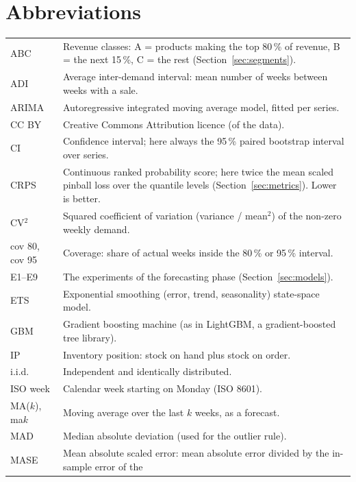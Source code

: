 \documentclass[11pt,a4paper]{article}
\begin{document}
\clearpage
\appendix

\section{Abbreviations}
\label{app:glossary}

\begin{center}
\footnotesize
\begin{tabular}{@{}>{\raggedright\arraybackslash}p{} p{}@{}}
  \toprule
  ABC & Revenue classes: A = products making the top 80\,\% of revenue, B = the next 15\,\%,
        C = the rest (Section~\ref{sec:segments}). \\
  ADI & Average inter-demand interval: mean number of weeks between weeks with a sale. \\
  ARIMA & Autoregressive integrated moving average model, fitted per series. \\
  CC BY & Creative Commons Attribution licence (of the data). \\
  CI & Confidence interval; here always the 95\,\% paired bootstrap interval over series. \\
  CRPS & Continuous ranked probability score; here twice the mean scaled pinball loss over the
         quantile levels (Section~\ref{sec:metrics}). Lower is better. \\
  CV$^2$ & Squared coefficient of variation (variance / mean$^2$) of the non-zero weekly demand. \\
  cov 80, cov 95 & Coverage: share of actual weeks inside the 80\,\% or 95\,\% interval. \\
  E1--E9 & The experiments of the forecasting phase (Section~\ref{sec:models}). \\
  ETS & Exponential smoothing (error, trend, seasonality) state-space model. \\
  GBM & Gradient boosting machine (as in LightGBM, a gradient-boosted tree library). \\
  IP & Inventory position: stock on hand plus stock on order. \\
  i.i.d. & Independent and identically distributed. \\
  ISO week & Calendar week starting on Monday (ISO 8601). \\
  MA($k$), ma$k$ & Moving average over the last $k$ weeks, as a forecast. \\
  MAD & Median absolute deviation (used for the outlier rule). \\
  MASE & Mean absolute scaled error: mean absolute error divided by the in-sample error of the

\end{tabular}
\end{center}
\end{document}
